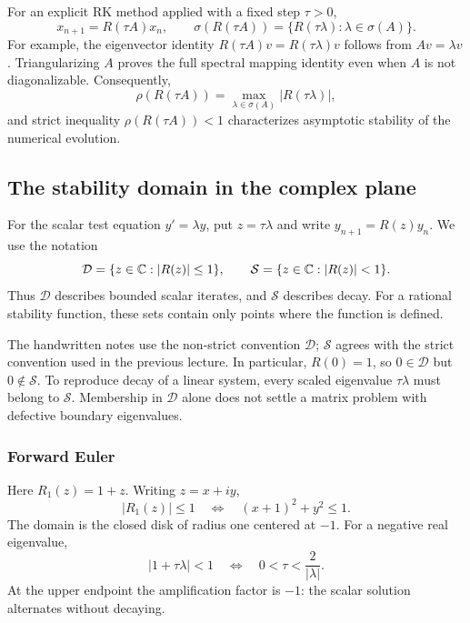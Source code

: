 For an explicit RK method applied with a fixed step \(\tau>0\),
\[
 x_{n+1}=R(\tau A)x_n,
 \qquad
 \sigma(R(\tau A))=\{R(\tau\lambda):\lambda\in\sigma(A)\}.
\]
For example, the eigenvector identity
\(R(\tau A)v=R(\tau\lambda)v\) follows from \(Av=\lambda v\).
Triangularizing \(A\) proves the full spectral mapping identity even
when \(A\) is not diagonalizable. Consequently,
\[
 \rho(R(\tau A))=\max_{\lambda\in\sigma(A)}|R(\tau\lambda)|,
\]
and strict inequality \(\rho(R(\tau A))<1\) characterizes asymptotic
stability of the numerical evolution.

\subsection{The stability domain in the complex plane}

\begin{definition}
 For the scalar test equation \(y'=\lambda y\), put \(z=\tau\lambda\)
 and write \(y_{n+1}=R(z)y_n\). We use the notation
 \begin{equation}\label{eq:closed-stability-domain-sep-16}
  \mathcal D=\{z\in\mathbb{C}:|R(z)|\leq1\},
  \qquad
  \mathcal S=\{z\in\mathbb{C}:|R(z)|<1\}.
 \end{equation}
 Thus \(\mathcal D\) describes bounded scalar iterates, and
 \(\mathcal S\) describes decay. For a rational stability function,
 these sets contain only points where the function is defined.
\end{definition}

The handwritten notes use the non-strict convention \(\mathcal D\);
\(\mathcal S\) agrees with the strict convention used in the previous
lecture. In particular, \(R(0)=1\), so \(0\in\mathcal D\) but
\(0\notin\mathcal S\). To reproduce decay of a linear system, every
scaled eigenvalue \(\tau\lambda\) must belong to \(\mathcal S\).
Membership in \(\mathcal D\) alone does not settle a matrix problem
with defective boundary eigenvalues.

\subsubsection{Forward Euler}

Here \(R_1(z)=1+z\). Writing \(z=x+iy\),
\[
 |R_1(z)|\leq1
 \quad\Longleftrightarrow\quad
 (x+1)^2+y^2\leq1.
\]
The domain is the closed disk of radius one centered at \(-1\).
For a negative real eigenvalue,
\begin{equation}\label{eq:euler-real-bound-sep-16}
 |1+\tau\lambda|<1
 \quad\Longleftrightarrow\quad
 0<\tau<\frac{2}{|\lambda|}.
\end{equation}
At the upper endpoint the amplification factor is \(-1\): the scalar
solution alternates without decaying.

